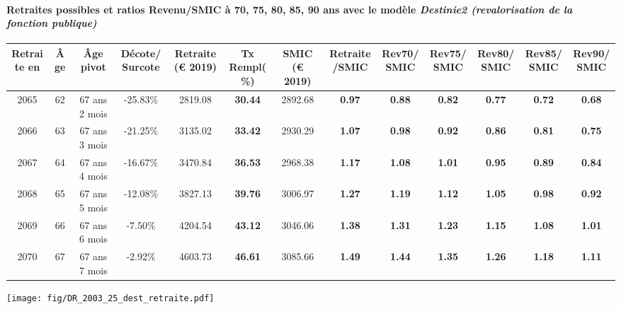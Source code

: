\paragraph{Retraites possibles et ratios Revenu/SMIC à 70, 75, 80, 85, 90 ans avec le modèle \emph{Destinie2 (revalorisation de la fonction publique)}}  
 
{ \scriptsize \begin{center} 
\begin{tabular}[htb]{|c|c||c|c||c|c||c||c|c|c|c|c|c|} 
\hline 
 Retraite en &  Âge &  Âge pivot &  Décote/Surcote &  Retraite (\euro{} 2019) &  Tx Rempl(\%) &  SMIC (\euro{} 2019) &  Retraite/SMIC &  Rev70/SMIC &  Rev75/SMIC &  Rev80/SMIC &  Rev85/SMIC &  Rev90/SMIC \\ 
\hline \hline 
 2065 &  62 &  67 ans 2 mois &  -25.83\% &  2819.08 &  {\bf 30.44} &  2892.68 &  {\bf {\color{red} 0.97}} &  {\bf {\color{red} 0.88}} &  {\bf {\color{red} 0.82}} &  {\bf {\color{red} 0.77}} &  {\bf {\color{red} 0.72}} &  {\bf {\color{red} 0.68}} \\ 
\hline 
 2066 &  63 &  67 ans 3 mois &  -21.25\% &  3135.02 &  {\bf 33.42} &  2930.29 &  {\bf 1.07} &  {\bf {\color{red} 0.98}} &  {\bf {\color{red} 0.92}} &  {\bf {\color{red} 0.86}} &  {\bf {\color{red} 0.81}} &  {\bf {\color{red} 0.75}} \\ 
\hline 
 2067 &  64 &  67 ans 4 mois &  -16.67\% &  3470.84 &  {\bf 36.53} &  2968.38 &  {\bf 1.17} &  {\bf 1.08} &  {\bf 1.01} &  {\bf {\color{red} 0.95}} &  {\bf {\color{red} 0.89}} &  {\bf {\color{red} 0.84}} \\ 
\hline 
 2068 &  65 &  67 ans 5 mois &  -12.08\% &  3827.13 &  {\bf 39.76} &  3006.97 &  {\bf 1.27} &  {\bf 1.19} &  {\bf 1.12} &  {\bf 1.05} &  {\bf {\color{red} 0.98}} &  {\bf {\color{red} 0.92}} \\ 
\hline 
 2069 &  66 &  67 ans 6 mois &  -7.50\% &  4204.54 &  {\bf 43.12} &  3046.06 &  {\bf 1.38} &  {\bf 1.31} &  {\bf 1.23} &  {\bf 1.15} &  {\bf 1.08} &  {\bf 1.01} \\ 
\hline 
 2070 &  67 &  67 ans 7 mois &  -2.92\% &  4603.73 &  {\bf 46.61} &  3085.66 &  {\bf 1.49} &  {\bf 1.44} &  {\bf 1.35} &  {\bf 1.26} &  {\bf 1.18} &  {\bf 1.11} \\ 
\hline 
\hline 
\end{tabular} 
\end{center} } 

 \begin{center}\texttt{[image: fig/DR\_2003\_25\_dest\_retraite.pdf]}\end{center} \label{fig/DR_2003_25_dest_retraite.pdf} 

